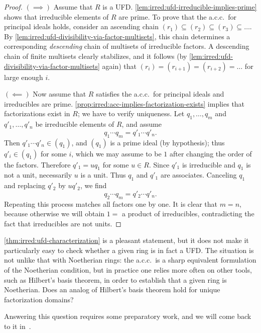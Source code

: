 \begin{proof}
  $(\implies)$ Assume that $R$ is a UFD. \cref{lem:irred:ufd-irreducible-implies-prime} shows
  that irreducible elements of $R$ are prime. To prove that the
  a.c.c.\ for principal ideals holds, consider an ascending chain
  $(r_1) \subseteq (r_2) \subseteq (r_3) \subseteq \dots$. By
  \cref{lem:irred:ufd-divisibility-via-factor-multisets}, this chain determines a corresponding
  \emph{descending} chain of multisets of irreducible factors. A
  descending chain of finite multisets clearly stabilizes, and it
  follows (by \cref{lem:irred:ufd-divisibility-via-factor-multisets} again) that
  $(r_i) = (r_{i+1}) = (r_{i+2}) = \dots$ for large enough $i$.

  $(\impliedby)$ Now assume that $R$ satisfies the a.c.c.\ for
  principal ideals and irreducibles are prime. \cref{prop:irred:acc-implies-factorization-exists}
  implies that factorizations exist in $R$; we have to verify
  uniqueness. Let $q_1, \dots, q_m$ and $q'_1, \dots, q'_n$ be
  irreducible elements of $R$, and assume
  \[q_1 \cdots q_m = q'_1 \cdots q'_n.\] Then
  $q'_1 \cdots q'_n \in (q_1)$, and $(q_1)$ is a prime ideal (by
  hypothesis); thus $q'_i \in (q_1)$ for some $i$, which we may assume
  to be $1$ after changing the order of the factors. Therefore
  $q'_1 = uq_1$ for some $u \in R$. Since $q'_1$ is irreducible and
  $q_1$ is not a unit, necessarily $u$ is a unit. Thus $q_1$ and
  $q'_1$ are associates. Canceling $q_1$ and replacing $q'_2$ by
  $uq'_2$, we find
  \[q_2 \cdots q_m = q'_2 \cdots q'_n.\] Repeating this process
  matches all factors one by one. It is clear that $m = n$, because
  otherwise we will obtain $1 =$ a product of irreducibles,
  contradicting the fact that irreducibles are not units.
\end{proof}

\cref{thm:irred:ufd-characterization} is a pleasant statement, but it does not make it
particularly easy to check whether a given ring is in fact a UFD. The
situation is not unlike that with Noetherian rings: the a.c.c.\ is a
sharp equivalent formulation of the Noetherian condition, but in
practice one relies more often on other tools, such as Hilbert's basis
theorem, in order to establish that a given ring is Noetherian. Does
an analog of Hilbert's basis theorem hold for unique factorization
domains?

Answering this question requires some preparatory work, and we will
come back to it
in~.

